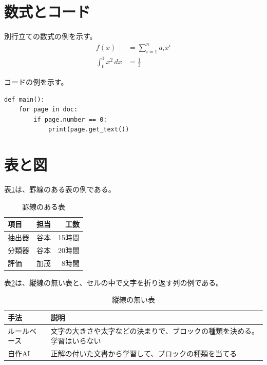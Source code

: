 \documentclass[uplatex,a4paper,11pt]{jsarticle}
\begin{document}
\section{数式とコード}

別行立ての数式の例を示す。
\begin{align*}
  f(x) &= \sum_{i=1}^{n} a_i x^i \\
  \int_0^1 x^2 \, dx &= \frac{1}{3}
\end{align*}

コードの例を示す。
\begin{verbatim}
def main():
    for page in doc:
        if page.number == 0:
            print(page.get_text())
\end{verbatim}

\section{表と図}

表\ref{tab:grid}は、罫線のある表の例である。
\begin{table}[htbp]
  \centering
  \caption{罫線のある表}  %
  \label{tab:grid}
  \begin{tabular}{|l|c|r|}
    \hline
    項目 & 担当 & 工数 \\
    \hline
    抽出器 & 谷本 & 15時間 \\
    分類器 & 谷本 & 20時間 \\
    評価 & 加茂 & 8時間 \\
    \hline
  \end{tabular}
\end{table}

表\ref{tab:booktabs}は、縦線の無い表と、セルの中で文字を折り返す列の例である。
\begin{table}[htbp]
  \centering
  \caption{縦線の無い表}
  \label{tab:booktabs}
  \begin{tabular}{lp{5cm}}
    \toprule
    手法 & 説明 \\
    \midrule
    ルールベース & 文字の大きさや太字などの決まりで、ブロックの種類を決める。学習はいらない \\
    自作AI & 正解の付いた文書から学習して、ブロックの種類を当てる \\
    \bottomrule
  \end{tabular}
\end{table}
\end{document}
